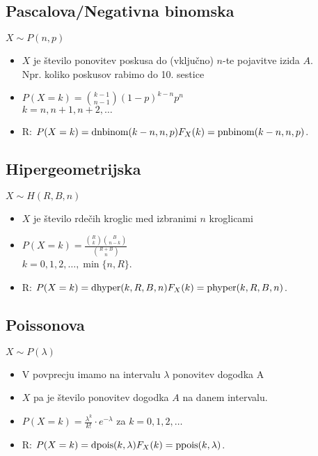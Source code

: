 \subsection{Pascalova/Negativna binomska}
$X\sim P(n,p)$
\begin{itemize}[leftmargin=*]
\item $X$ je število ponovitev poskusa do (vključno) $n$-te pojavitve izida $A$.\\
Npr. koliko poskusov rabimo do 10. sestice
\item $P(X=k)=\binom{k-1}{n-1}(1-p)^{k-n}p^n$\\$k=n,n+1,n+2,\ldots$
\item R: $P(X=k)=\text{dnbinom}(k-n,n,p)\\F_X(k)=\text{pnbinom}(k-n,n,p)$.
\end{itemize}


\subsection{Hipergeometrijska}
$X\sim H(R,B,n)$
\begin{itemize}[leftmargin=*]
    \item $X$ je število rdečih kroglic med izbranimi $n$ kroglicami
    \item $\displaystyle  P(X=k)=\frac{\binom{R}{k}\binom{B}{n-k}}{\binom{R+B}{n}}$\\$k=0,1,2,\ldots,\min\{n,R\}$.
    \item R: $P(X=k)=\text{dhyper}(k,R,B,n)\\F_X(k)=\text{phyper}(k,R,B,n)$.
\end{itemize}


\subsection{Poissonova}
$X\sim P(\lambda)$
\begin{itemize}[leftmargin=*]
\item V povprecju imamo na intervalu $\lambda$ ponovitev dogodka A
\item $X$ pa je število ponovitev dogodka $A$ na danem intervalu.
\item $\displaystyle  P(X=k)=\frac{\lambda^k}{k!}\cdot e^{-\lambda}$ za $k=0,1,2,\ldots$
\item R: $P(X=k)=\text{dpois}(k,\lambda)\\
F_X(k)=\text{ppois}(k,\lambda)$.
\end{itemize}

